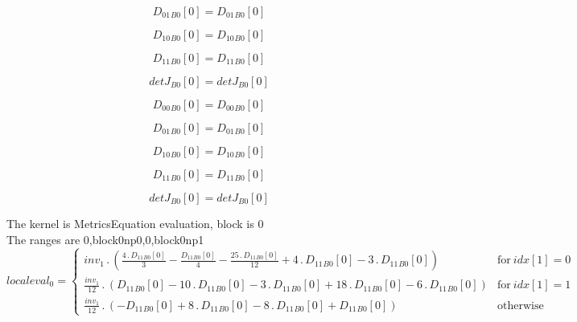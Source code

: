 \documentclass{article}
\begin{document}
\begin{dmath}{D_{01}{_{B0}}}[{0}] = {D_{01}{_{B0}}}[{0}]\end{dmath}

\begin{dmath}{D_{10}{_{B0}}}[{0}] = {D_{10}{_{B0}}}[{0}]\end{dmath}

\begin{dmath}{D_{11}{_{B0}}}[{0}] = {D_{11}{_{B0}}}[{0}]\end{dmath}

\begin{dmath}{detJ{_{B0}}}[{0}] = {detJ{_{B0}}}[{0}]\end{dmath}

\begin{dmath}{D_{00}{_{B0}}}[{0}] = {D_{00}{_{B0}}}[{0}]\end{dmath}

\begin{dmath}{D_{01}{_{B0}}}[{0}] = {D_{01}{_{B0}}}[{0}]\end{dmath}

\begin{dmath}{D_{10}{_{B0}}}[{0}] = {D_{10}{_{B0}}}[{0}]\end{dmath}

\begin{dmath}{D_{11}{_{B0}}}[{0}] = {D_{11}{_{B0}}}[{0}]\end{dmath}

\begin{dmath}{detJ{_{B0}}}[{0}] = {detJ{_{B0}}}[{0}]\end{dmath}

\noindent The kernel is MetricsEquation evaluation, block is 0\\\noindent The ranges are 0,block0np0,0,block0np1\\\begin{dmath}localeval_{0} = \begin{cases} inv_1 \,.\, \left(\frac{4 \,.\, {D_{11}{_{B0}}}[{0}]}{3} - \frac{{D_{11}{_{B0}}}[{0}]}{4} - \frac{25 \,.\, {D_{11}{_{B0}}}[{0}]}{12} + 4 \,.\, {D_{11}{_{B0}}}[{0}] - 3 \,.\, {D_{11}{_{B0}}}[{0}]\right) & 
\text{for}\: {idx}[{1}] = 0 \\\frac{inv_1}{12} \,.\, \left({D_{11}{_{B0}}}[{0}] - 10 \,.\, {D_{11}{_{B0}}}[{0}] - 3 \,.\, {D_{11}{_{B0}}}[{0}] + 18 \,.\, {D_{11}{_{B0}}}[{0}] - 6 \,.\, {D_{11}{_{B0}}}[{0}]\right) & \text{for}\: {idx}[{1}] = 1 
\\\frac{inv_1}{12} \,.\, \left(- {D_{11}{_{B0}}}[{0}] + 8 \,.\, {D_{11}{_{B0}}}[{0}] - 8 \,.\, {D_{11}{_{B0}}}[{0}] + {D_{11}{_{B0}}}[{0}]\right) & \text{otherwise} \end{cases}\end{dmath}
\end{document}
